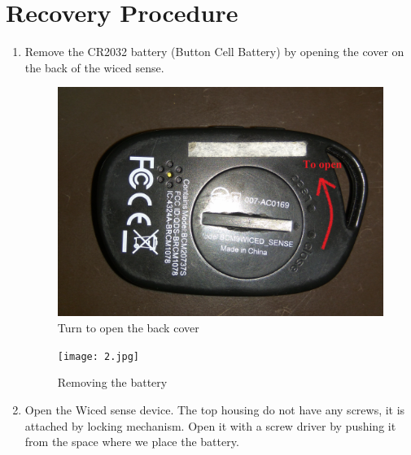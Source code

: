 \documentclass[11pt,a4paper]{article}
\begin{document}
\section{Recovery Procedure}
	\begin{enumerate}
	  \item Remove the CR2032 battery (Button Cell Battery) by opening the cover on the back of the wiced sense.
	  \begin{figure}[h]
        \centering
    	\includegraphics[scale=0.05]{1.jpg}
    		\caption{Turn to open the back cover}
	    \end{figure}
	     \begin{figure}[h]
        \centering
    	\texttt{[image: 2.jpg]}
    		\caption{Removing the battery}
	    \end{figure}
	  \item Open the Wiced sense device. The top housing do not have any screws, it is attached by locking mechanism. Open it with a screw driver by pushing it from the space where we place the battery.
	  

\end{enumerate}
\end{document}
